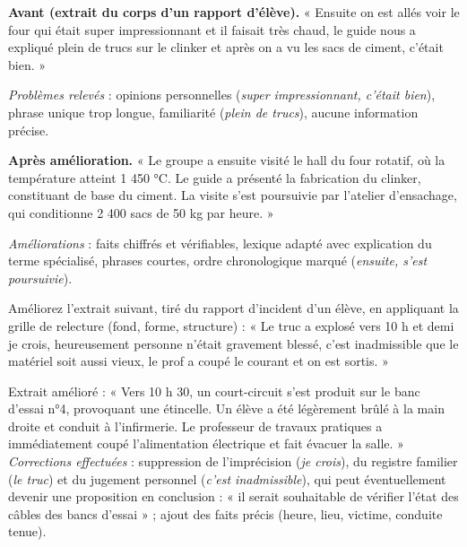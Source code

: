 \documentclass[11pt]{article}
\begin{document}
\begin{exemplebox}
\textbf{Avant (extrait du corps d'un rapport d'élève).} « Ensuite on est allés voir le four qui était super impressionnant et il faisait très chaud, le guide nous a expliqué plein de trucs sur le clinker et après on a vu les sacs de ciment, c'était bien. »

\emph{Problèmes relevés} : opinions personnelles (\emph{super impressionnant, c'était bien}), phrase unique trop longue, familiarité (\emph{plein de trucs}), aucune information précise.

\textbf{Après amélioration.} « Le groupe a ensuite visité le hall du four rotatif, où la température atteint 1 450 °C. Le guide a présenté la fabrication du clinker, constituant de base du ciment. La visite s'est poursuivie par l'atelier d'ensachage, qui conditionne 2 400 sacs de 50 kg par heure. »

\emph{Améliorations} : faits chiffrés et vérifiables, lexique adapté avec explication du terme spécialisé, phrases courtes, ordre chronologique marqué (\emph{ensuite, s'est poursuivie}).
\end{exemplebox}

\begin{exercice}
Améliorez l'extrait suivant, tiré du rapport d'incident d'un élève, en appliquant la grille de relecture (fond, forme, structure) : « Le truc a explosé vers 10 h et demi je crois, heureusement personne n'était gravement blessé, c'est inadmissible que le matériel soit aussi vieux, le prof a coupé le courant et on est sortis. »
\end{exercice}

\begin{corrige}
Extrait amélioré : « Vers 10 h 30, un court-circuit s'est produit sur le banc d'essai n°4, provoquant une étincelle. Un élève a été légèrement brûlé à la main droite et conduit à l'infirmerie. Le professeur de travaux pratiques a immédiatement coupé l'alimentation électrique et fait évacuer la salle. » \emph{Corrections effectuées} : suppression de l'imprécision (\emph{je crois}), du registre familier (\emph{le truc}) et du jugement personnel (\emph{c'est inadmissible}), qui peut éventuellement devenir une proposition en conclusion : « il serait souhaitable de vérifier l'état des câbles des bancs d'essai » ; ajout des faits précis (heure, lieu, victime, conduite tenue).
\end{corrige}
\end{document}
